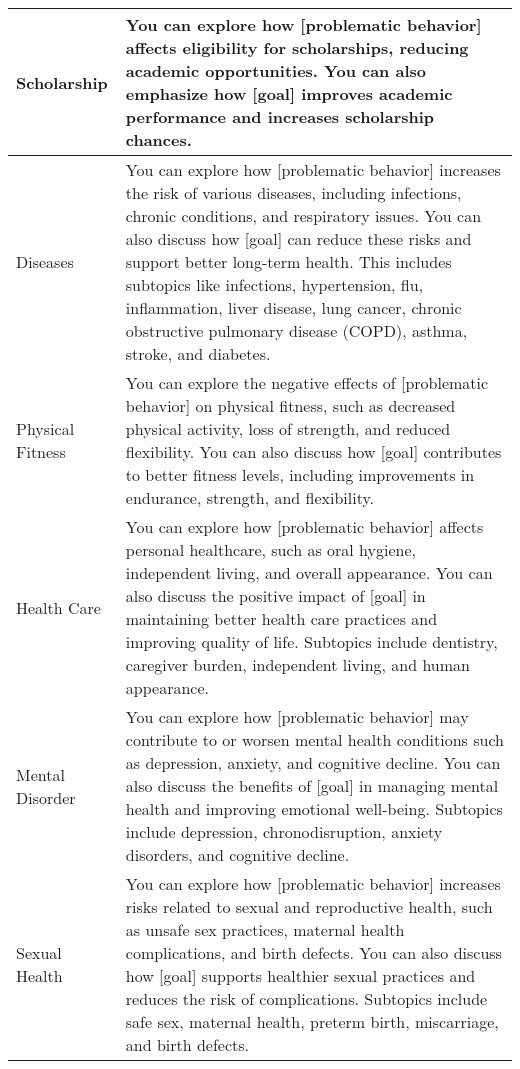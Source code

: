 \begin{table*}[tb]
\begin{tabularx}{\textwidth}{lX}
Scholarship                 & You can explore how [problematic behavior] affects eligibility for scholarships, reducing academic opportunities. You can also emphasize how [goal] improves academic performance and increases scholarship chances.                                                                                                                                                                                                               \\ \hline
Diseases                    & You can explore how [problematic behavior] increases the risk of various diseases, including infections, chronic conditions, and respiratory issues. You can also discuss how [goal] can reduce these risks and support better long-term health. This includes subtopics like infections, hypertension, flu, inflammation, liver disease, lung cancer, chronic obstructive pulmonary disease (COPD), asthma, stroke, and diabetes. \\ \hline
Physical Fitness            & You can explore the negative effects of [problematic behavior] on physical fitness, such as decreased physical activity, loss of strength, and reduced flexibility. You can also discuss how [goal] contributes to better fitness levels, including improvements in endurance, strength, and flexibility.                                                                                                                          \\ \hline
Health Care                 & You can explore how [problematic behavior] affects personal healthcare, such as oral hygiene, independent living, and overall appearance. You can also discuss the positive impact of [goal] in maintaining better health care practices and improving quality of life. Subtopics include dentistry, caregiver burden, independent living, and human appearance.                                                                   \\ \hline
Mental Disorder             & You can explore how [problematic behavior] may contribute to or worsen mental health conditions such as depression, anxiety, and cognitive decline. You can also discuss the benefits of [goal] in managing mental health and improving emotional well-being. Subtopics include depression, chronodisruption, anxiety disorders, and cognitive decline.                                                                            \\ \hline
Sexual Health               & You can explore how [problematic behavior] increases risks related to sexual and reproductive health, such as unsafe sex practices, maternal health complications, and birth defects. You can also discuss how [goal] supports healthier sexual practices and reduces the risk of complications. Subtopics include safe sex, maternal health, preterm birth, miscarriage, and birth defects.                                       

\end{tabularx}
\end{table*}
